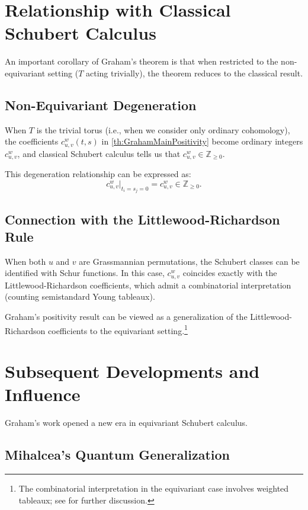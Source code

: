 \section{Relationship with Classical Schubert Calculus}

\begin{sloppypar}
An important corollary of Graham's theorem is that when restricted to the non-equivariant setting ($T$ acting trivially), the theorem reduces to the classical result.
\end{sloppypar}

\subsection{Non-Equivariant Degeneration}

When $T$ is the trivial torus (i.e., when we consider only ordinary cohomology), the coefficients $c_{u,v}^w(t,s)$ in \cref{th:GrahamMainPositivity} become ordinary integers $c_{u,v}^w$, and classical Schubert calculus tells us that $c_{u,v}^w \in \mathbb{Z}_{\geq 0}$.

This degeneration relationship can be expressed as:
$$c_{u,v}^w|_{t_i = s_j = 0} = c_{u,v}^w \in \mathbb{Z}_{\geq 0}.$$

\subsection{Connection with the Littlewood-Richardson Rule}

When both $u$ and $v$ are Grassmannian permutations, the Schubert classes can be identified with Schur functions. In this case, $c_{u,v}^w$ coincides exactly with the Littlewood-Richardson coefficients, which admit a combinatorial interpretation (counting semistandard Young tableaux).

Graham's positivity result can be viewed as a generalization of the Littlewood-Richardson coefficients to the equivariant setting.\footnote{The combinatorial interpretation in the equivariant case involves weighted tableaux; see \cite{Mihalcea} for further discussion.}

\section{Subsequent Developments and Influence}

Graham's work opened a new era in equivariant Schubert calculus.

\subsection{Mihalcea's Quantum Generalization}

